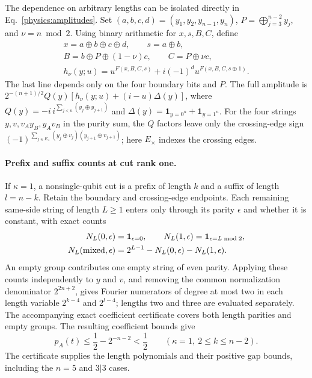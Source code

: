 The dependence on arbitrary lengths can be isolated directly in Eq.~\eqref{physics:amplitudes}. Set $(a,b,c,d)=(y_1,y_2,y_{n-1},y_n)$, $P=\bigoplus_{j=3}^{n-2}y_j$, and $\nu=n\bmod2$. Using binary arithmetic for $x,s,B,C$, define
\begin{equation}
 \begin{gathered}
 x=a\oplus b\oplus c\oplus d,\qquad s=a\oplus b,\\
 B=b\oplus P\oplus(1-\nu)c,\qquad C=P\oplus\nu c,\\
 h_\nu(y;u)=u^{F(x,B,C,s)}+i(-1)^d u^{F(x,B,C,s\oplus1)}.
 \end{gathered}
 \label{physics:boundary-amplitude}
\end{equation}
The last line depends only on the four boundary bits and $P$. The full amplitude is $2^{-(n+1)/2}Q(y)[h_\nu(y;u)+(i-u)\Delta(y)]$, where $Q(y)=-i\,i^{\sum_{j<n}(y_j\oplus y_{j+1})}$ and $\Delta(y)=\mathbf1_{y=0^n}+\mathbf1_{y=1^n}$.
For the four strings $y,v,v_Ay_B,y_Av_B$ in the purity sum, the $Q$ factors leave only the crossing-edge sign $(-1)^{\sum_{j\in E_\times}(y_j\oplus v_j)(y_{j+1}\oplus v_{j+1})}$; here $E_\times$ indexes the crossing edges.

\paragraph*{Prefix and suffix counts at cut rank one.}
If $\kappa=1$, a nonsingle-qubit cut is a prefix of length $k$ and a suffix of length $l=n-k$. Retain the boundary and crossing-edge endpoints. Each remaining same-side string of length $L\ge1$ enters only through its parity $\epsilon$ and whether it is constant, with exact counts
\begin{equation}
 \begin{aligned}
 N_L(0,\epsilon)&=\mathbf1_{\epsilon=0},\qquad
 N_L(1,\epsilon)=\mathbf1_{\epsilon=L\bmod2},\\
 N_L({\rm mixed},\epsilon)&=2^{L-1}-N_L(0,\epsilon)-N_L(1,\epsilon).
 \end{aligned}
 \label{physics:length-counts}
\end{equation}
An empty group contributes one empty string of even parity. Applying these counts independently to $y$ and $v$, and removing the common normalization denominator $2^{2n+2}$, gives Fourier numerators of degree at most two in each length variable $2^{k-4}$ and $2^{l-4}$; lengths two and three are evaluated separately. The accompanying exact coefficient certificate covers both length parities and empty groups. The resulting coefficient bounds give
\begin{equation}
 p_A(t)\le\frac12-2^{-n-2}<\frac12
 \qquad(\kappa=1,\ 2\le k\le n-2).
 \label{physics:rank-one-gaps}
\end{equation}
The certificate supplies the length polynomials and their positive gap bounds, including the $n=5$ and $3|3$ cases.

